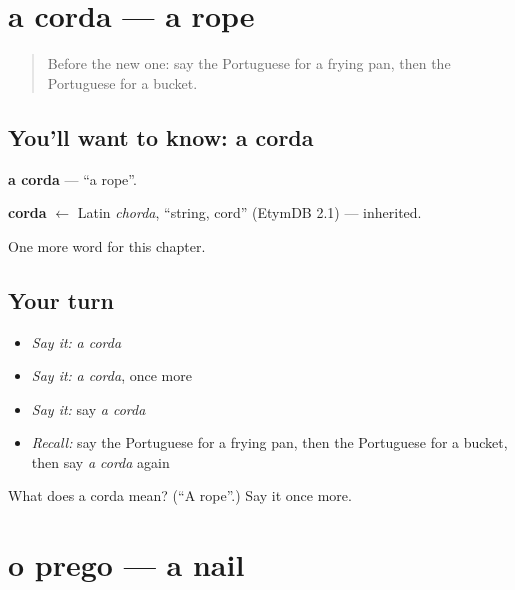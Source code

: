 \section[a corda]{a corda — a rope}

\label{lesson:PT-C97-corda}



\begin{quote}
Before the new one: say the Portuguese for a frying pan, then the Portuguese for a bucket.
\end{quote}

\subsection*{You'll want to know: a corda}
\textbf{a corda} — \textquotedblleft{}a rope\textquotedblright{}.

\begin{cousinweb}
\textbf{corda} $\leftarrow$ Latin \emph{chorda}, \textquotedblleft{}string, cord\textquotedblright{} (EtymDB 2.1) — inherited.
\end{cousinweb}

\begin{grammarlens}[title={What you've built}]
One more word for this chapter.
\end{grammarlens}

\subsection*{Your turn}
\begin{itemize}
\raggedright
  \item \emph{Say it:} \emph{a corda}
  \item \emph{Say it:} \emph{a corda}, once more
  \item \emph{Say it:} say \emph{a corda}
  \item \emph{Recall:} say the Portuguese for a frying pan, then the Portuguese for a bucket, then say \emph{a corda} again
\end{itemize}

\begin{tcolorbox}[breakable,colback=teal!4,colframe=teal!35!black,title={Before you move on}]
What does a corda mean? (\textquotedblleft{}A rope\textquotedblright{}.) Say it once more.
\end{tcolorbox}
\section[o prego]{o prego — a nail}

